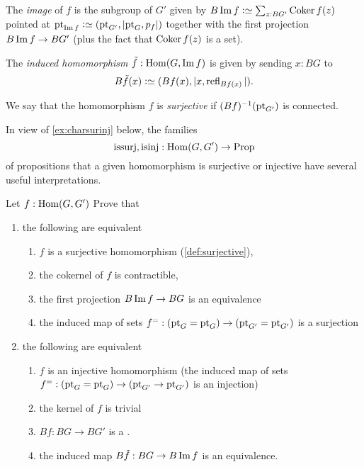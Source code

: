 \begin{definition}
\label{def:image}\label{def:surjective}
The \emph{image} of $f$ is the subgroup of $G'$ given by $B\image f\defequi \sum_{z:BG'}\coker f(z)$ pointed at $\pt_{\image f}\defequi (\pt_{G'},|\pt_G,p_f|)$ together with the first projection $B\image f\to BG'$ (plus the fact that $\coker f(z)$ is a set).  

The \emph{induced homomorphism} $\tilde f:\Hom(G,\image f)$ is given by sending $x:BG$ to 
$$B\tilde f(x)\defequi (Bf(x),|x,\refl{Bf(x)}|).$$ 

We say that the homomorphism $f$ is \emph{surjective} if $(Bf)^{-1}(\mathrm{pt}_{G'})$ is connected.
\end{definition}
In view of \cref{ex:charsurinj} below, the families  
$$\mathrm{issurj},\mathrm{isinj}:\Hom(G,G')\to\Prop
$$
of propositions that a given homomorphism is surjective or injective have several useful interpretations.
\begin{xca}
  \label{ex:charsurinj}
  Let $f:\Hom(G,G')$ Prove that
  \begin{enumerate}
  \item the following are equivalent
    \begin{enumerate}
    \item $f$ is a surjective homomorphism (\cref{def:surjective}),
    \item the cokernel of $f$ is contractible,
    \item the first projection $B\image f\to BG$ is an equivalence
    \item the induced map of sets 
$f^=:(\mathrm{pt}_G=\mathrm{pt}_G)\to(\mathrm{pt}_{G'}=\mathrm{pt}_{G'})$ is a surjection
    \end{enumerate}
  \item the following are equivalent
    \begin{enumerate}
    \item $f$ is an injective homomorphism (\ie the induced map of sets 
$f^=:(\mathrm{pt}_G=\mathrm{pt}_G)\to(\mathrm{pt}_{G'}\to\mathrm{pt}_{G'})$
is an injection)
\item the kernel of $f$ is trivial
\item $Bf:BG\to BG'$ is a \covering.
\item the induced map $B\tilde f:BG\to B\image f$ is an equivalence.
    \end{enumerate}
  \end{enumerate}
\end{xca}



